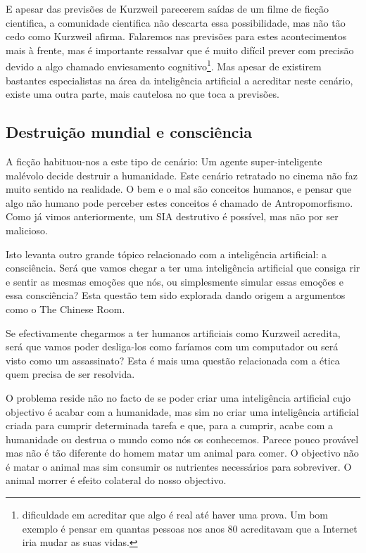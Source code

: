 \documentclass[runningheads,a4paper]{llncs}
\begin{document}
E apesar das previsões de Kurzweil parecerem saídas de um filme de ficção cientifica, a comunidade cientifica não descarta essa possibilidade, mas não tão cedo como Kurzweil afirma. Falaremos nas previsões para estes acontecimentos mais à frente, mas é importante ressalvar que é muito difícil prever com precisão devido a algo chamado enviesamento cognitivo\footnote{dificuldade em acreditar que algo é real até haver uma prova. Um bom exemplo é pensar em quantas pessoas nos anos 80 acreditavam que a Internet iria mudar as suas vidas.}. Mas apesar de existirem bastantes especialistas na área da inteligência artificial a acreditar neste cenário, existe uma outra parte, mais cautelosa no que toca a previsões.

\subsection{Destruição mundial e consciência}

A ficção habituou-nos a este tipo de cenário: Um agente super-inteligente malévolo decide destruir a humanidade. Este cenário retratado no cinema não faz muito sentido na realidade. O bem e o mal são conceitos humanos, e pensar que algo não humano pode perceber estes conceitos é chamado de Antropomorfismo. Como já vimos anteriormente, um SIA destrutivo é possível, mas não por ser malicioso.

Isto levanta outro grande tópico relacionado com a inteligência artificial: a consciência. Será que vamos chegar a ter uma inteligência artificial que consiga rir e sentir as mesmas emoções que nós, ou simplesmente simular essas emoções e essa consciência? Esta questão tem sido explorada dando origem a argumentos como o The Chinese Room\cite{chineseroom}.

Se efectivamente chegarmos a ter humanos artificiais como Kurzweil acredita, será que vamos poder desliga-los como faríamos com um computador ou será visto como um assassinato? Esta é mais uma questão relacionada com a ética quem precisa de ser resolvida.

O problema reside não no facto de se poder criar uma inteligência artificial cujo objectivo é acabar com a humanidade, mas sim no criar uma inteligência artificial criada para cumprir determinada tarefa e que, para a cumprir, acabe com a humanidade ou destrua o mundo como nós os conhecemos. Parece pouco provável mas não é tão diferente do homem matar um animal para comer. O objectivo não é matar o animal mas sim consumir os nutrientes necessários para sobreviver. O animal morrer é efeito colateral do nosso objectivo.
\end{document}
